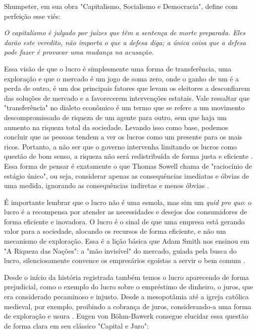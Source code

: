 Shumpeter, em sua obra "Capitalismo, Socialismo e Democracia", define com perfeição esse viés:

\begin{citacao}
    \textit{O capitalismo é julgado por juízes que têm a sentença de morte preparada. Eles darão este veredito, não importa o que a defesa diga; a única coisa que a defesa pode fazer é provocar uma mudança na acusação. \newline
    }  \cite{schumpeter1976capitalism}
\end{citacao}

Essa visão de que o lucro é simplesmente uma forma de transferência, uma exploração e que o mercado é um jogo de soma zero, onde o ganho de um é a perda de outro, é um dos principais fatores que levam os eleitores a desconfiarem das soluções de mercado e a favorecerem intervenções estatais. Vale ressaltar que "transferência" no dialeto econômico é um termo que se refere a um movimento descompromissado de riqueza de um agente para outro, sem que haja um aumento na riqueza total da sociedade. Levando isso como base, podemos concluir que as pessoas tendem a ver os lucros como um presente para os mais ricos. Portanto, a não ser que o governo intervenha limitando os lucros como questão de bom senso, a riqueza não será redistribuída de forma justa e eficiente \cite{The_Myth_of_the_Rational_Voter}. Essa forma de pensar é exatamente o que Thomas Sowell chama de "raciocínio de estágio único", ou seja, considerar apenas as consequências imediatas e óbvias de uma medida, ignorando as consequências indiretas e menos óbvias \cite{sowell2004applied}.

É importante lembrar que o lucro não é uma esmola, mas sim um \textit{quid pro quo}: o lucro é a recompensa por atender as necessidades e desejos dos consumidores de forma eficiente e inovadora. O lucro é o sinal de que uma empresa está gerando valor para a sociedade, alocando os recursos de forma eficiente, e não um mecanismo de exploração. Essa é a lição básica que Adam Smith nos ensinou em "A Riqueza das Nações": a "mão invisível" do mercado, guiada pela busca do lucro, silenciosamente convence os empresários egoístas a servir o bem comum \cite{smith1776inquiry}.

Desde o início da história registrada também temos o lucro aparecendo de forma prejudicial, como o exemplo do lucro sobre o empréstimo de dinheiro, o juros, que era considerado pecaminoso e injusto. Desde a mesopotâmia até a igreja católica medieval, por exemplo, proibindo a cobrança de juros, considerando-a uma forma de exploração e usura \cite{tomasdeaquino_summa_78}. Eugen von Böhm-Bawerk consegue elucidar essa questão de forma clara em seu clássico "Capital e Juro":

